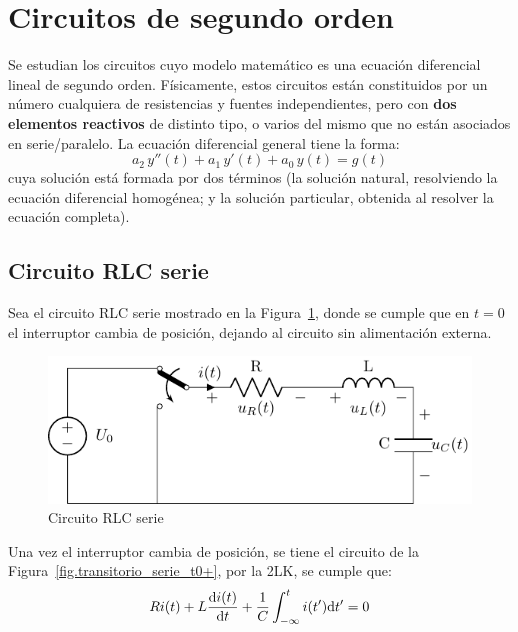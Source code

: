 \section{Circuitos de segundo orden}
Se estudian los circuitos cuyo modelo matemático es una ecuación
diferencial lineal de segundo orden. Físicamente, estos circuitos
están constituidos por un número cualquiera de resistencias y fuentes
independientes, pero con \textbf{dos elementos reactivos} de distinto
tipo, o varios del mismo que no están asociados en serie/paralelo. La
ecuación diferencial general tiene la forma:
\begin{equation*}
  a_2\,y''(t)+a_1\,y'(t)+a_0\,y(t)=g(t)
\end{equation*}
cuya solución está formada por dos términos (la solución natural,
resolviendo la ecuación diferencial homogénea; y la solución
particular, obtenida al resolver la ecuación completa).
	
\subsection{Circuito RLC serie}

Sea el circuito RLC serie mostrado en la
Figura~\ref{fig.transitorio_circuito_RLC_serie}, donde se cumple que
en $t = 0$ el interruptor cambia de posición, dejando al circuito sin
alimentación externa.
\begin{figure}[H]
  \centering
  \includegraphics{../figs/transitorio_circuitoRLC_serie.pdf}
  \caption{Circuito RLC serie}
  \label{fig.transitorio_circuito_RLC_serie}
\end{figure}

Una vez el interruptor cambia de posición, se tiene el circuito de la
Figura~\ref{fig.transitorio_serie_t0+}, por la 2LK, se cumple que:
\[
  Ri(t) + L\diff{i(t)}{t} + \frac{1}{C}\int_{-\infty}^t i(t')
  \mathrm{d}t' = 0
\]

